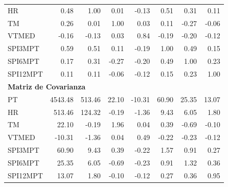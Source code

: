 \begin{table}[ht]
\begin{tabular}{lrrrrrrr}
HR       & 0.48 & 1.00 & 0.01 & -0.13 & 0.51 & 0.31 & 0.11 \\
TM       & 0.26 & 0.01 & 1.00 & 0.03 & 0.11 & -0.27 & -0.06 \\
VTMED    & -0.16 & -0.13 & 0.03 & 0.84 & -0.19 & -0.20 & -0.12 \\
SPI3MPT  & 0.59 & 0.51 & 0.11 & -0.19 & 1.00 & 0.49 & 0.15 \\
SPI6MPT  & 0.17 & 0.31 & -0.27 & -0.20 & 0.49 & 1.00 & 0.23 \\
SPI12MPT & 0.11 & 0.11 & -0.06 & -0.12 & 0.15 & 0.23 & 1.00 \\
\midrule
\multicolumn{8}{l}{\textbf{Matriz de Covarianza}} \\
\midrule
PT       & 4543.48 & 513.46 & 22.10 & -10.31 & 60.90 & 25.35 & 13.07 \\
HR       & 513.46 & 124.32 & -0.19 & -1.36 & 9.43 & 6.05 & 1.80 \\
TM       & 22.10 & -0.19 & 1.96 & 0.04 & 0.39 & -0.69 & -0.10 \\
VTMED    & -10.31 & -1.36 & 0.04 & 0.49 & -0.22 & -0.23 & -0.12 \\
SPI3MPT  & 60.90 & 9.43 & 0.39 & -0.22 & 1.57 & 0.91 & 0.27 \\
SPI6MPT  & 25.35 & 6.05 & -0.69 & -0.23 & 0.91 & 1.32 & 0.36 \\
SPI12MPT & 13.07 & 1.80 & -0.10 & -0.12 & 0.27 & 0.36 & 0.95 \\
\bottomrule
\end{tabular}
\end{table}






